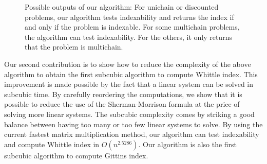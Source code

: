 \begin{figure}[ht]
    \centering
    \caption{Possible outputs of our algorithm: For unichain or discounted problems, our algorithm tests indexability and returns the index if and only if the problem is indexable. For some multichain problems, the algorithm can test indexability. For the others, it only returns that the problem is multichain.}
    \label{fig:possible_outputs}
\end{figure}

Our second contribution is to show how to reduce the complexity of the above algorithm to obtain the first subcubic algorithm to compute Whittle index. This improvement is made possible by the fact that a linear system can be solved in subcubic time. By carefully reordering the computations, we show that it is possible to reduce the use of the Sherman-Morrison formula at the price of solving more linear systems. The subcubic complexity comes by striking  a good balance between having too many or too few linear systems to solve. By using the current fastest matrix multiplication method, our algorithm can test indexability and compute Whittle index in $O(n^{2.5286})$. Our algorithm is also the first subcubic algorithm to compute Gittins index.

